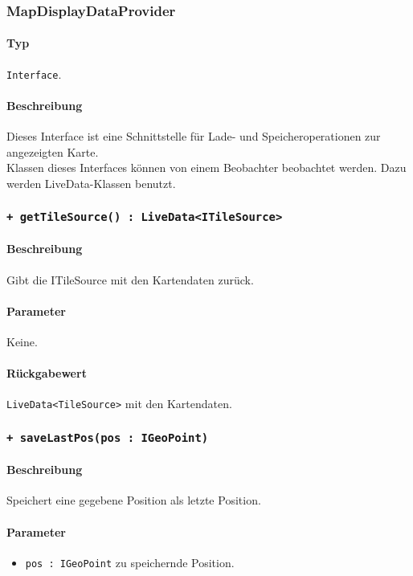 \subsubsection{MapDisplayDataProvider}
\paragraph*{Typ}
\texttt{Interface}.
\paragraph*{Beschreibung}
Dieses Interface ist eine Schnittstelle für Lade- und Speicheroperationen zur angezeigten Karte.\\
Klassen dieses Interfaces können von einem Beobachter beobachtet werden. Dazu werden 
LiveData-Klassen benutzt.

\subsubsection*{\texttt{+ getTileSource() : LiveData<ITileSource>}}%
\paragraph*{Beschreibung}
Gibt die ITileSource mit den Kartendaten zurück.
\paragraph*{Parameter}
Keine.
\paragraph*{Rückgabewert}
\texttt{LiveData<TileSource>} mit den Kartendaten.

\subsubsection*{\texttt{+ saveLastPos(pos : IGeoPoint)}}%
\paragraph*{Beschreibung}
Speichert eine gegebene Position als letzte Position.
\paragraph*{Parameter}
\begin{itemize}
    \item \texttt{pos : IGeoPoint} zu speichernde Position.
\end{itemize}
